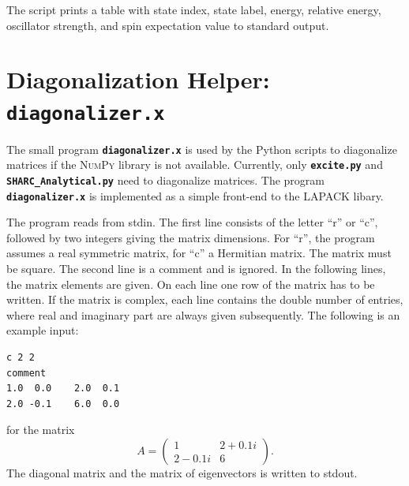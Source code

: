 \documentclass[a4paper,10pt,DIV=15,openany]{scrbook}
\newcommand{\ttt}[1]{\textbf{\texttt{#1}}}
\newenvironment{example}{
  \setlength{\OuterFrameSep}{3pt}
  \vspace{0mm}
  \definecolor{shadecolor}{HTML}{E4F4FF}
  \begin{shaded}
}{
  \end{shaded}
}
\begin{document}
The script prints a table with state index, state label, energy, relative energy, oscillator strength, and spin expectation value to standard output.











\section{Diagonalization Helper: \ttt{diagonalizer.x}}\label{sec:diagonalizer.x}

The small program \ttt{diagonalizer.x} is used by the Python scripts to diagonalize matrices if the \textsc{NumPy} library is not available. Currently, only \ttt{excite.py} and \ttt{SHARC\_Analytical.py} need to diagonalize matrices. The program \ttt{diagonalizer.x} is implemented as a simple front-end to the LAPACK libary.

The program reads from stdin. The first line consists of the letter ``r'' or ``c'', followed by two integers giving the matrix dimensions. For ``r'', the program assumes a real symmetric matrix, for ``c'' a Hermitian matrix. The matrix must be square.
The second line is a comment and is ignored.
In the following lines, the matrix elements are given. On each line one row of the matrix has to be written. If the matrix is complex, each line contains the double number of entries, where real and imaginary part are always given subsequently.
The following is an example input:
\begin{example}
\footnotesize\begin{verbatim}
c 2 2
comment
1.0  0.0    2.0  0.1
2.0 -0.1    6.0  0.0
\end{verbatim}
\end{example}

\normalsize
for the matrix 
\begin{equation}
  A=\begin{pmatrix}
      1 &2+0.1i\\
      2-0.1i&6
    \end{pmatrix}.
\end{equation}
The diagonal matrix and the matrix of eigenvectors is written to stdout.



\end{document}
